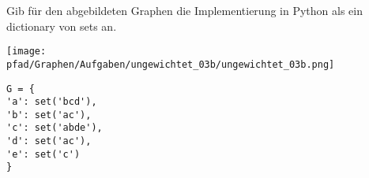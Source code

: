 ﻿\question[3]
Gib für den abgebildeten Graphen die Implementierung in Python als
ein dictionary von sets an.

\texttt{[image: \\pfad/Graphen/Aufgaben/ungewichtet\_03b/ungewichtet\_03b.png]}
\begin{solutionbox}{5cm}
\begin{lstlisting}
G = {
'a': set('bcd'),
'b': set('ac'),
'c': set('abde'),
'd': set('ac'),
'e': set('c')
}
\end{lstlisting}
\end{solutionbox}
